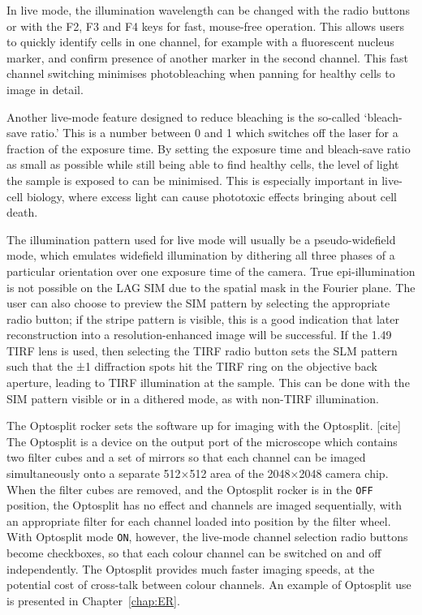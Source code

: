 In live mode, the illumination wavelength can be changed with the radio buttons or with the F2, F3 and F4 keys for fast, mouse-free operation. 
This allows users to quickly identify cells in one channel, for example with a fluorescent nucleus marker, and confirm presence of another marker in the second channel.
This fast channel switching minimises photobleaching when panning for healthy cells to image in detail. 

Another live-mode feature designed to reduce bleaching is the so-called `bleach-save ratio.' 
This is a number between 0 and 1 which switches off the laser for a fraction of the exposure time. 
By setting the exposure time and bleach-save ratio as small as possible while still being able to find healthy cells, the level of light the sample is exposed to can be minimised.
This is especially important in live-cell biology, where excess light can cause phototoxic effects bringing about cell death. 

The illumination pattern used for live mode will usually be a pseudo-widefield mode, which emulates widefield illumination by dithering all three phases of a particular orientation over one exposure time of the camera. 
True epi-illumination is not possible on the LAG SIM due to the spatial mask in the Fourier plane. 
The user can also choose to preview the SIM pattern by selecting the appropriate radio button; if the stripe pattern is visible, this is a good indication that later reconstruction into a resolution-enhanced image will be successful. 
If the \SI{1.49}{\numaperture} TIRF lens is used, then selecting the TIRF radio button sets the SLM pattern such that the ±1 diffraction spots hit the TIRF ring on the objective back aperture, leading to TIRF illumination at the sample. 
This can be done with the SIM pattern visible or in a dithered mode, as with non-TIRF illumination. 

The Optosplit rocker sets the software up for imaging with the Optosplit. [cite] 
The Optosplit is a device on the output port of the microscope which contains two filter cubes and a set of mirrors so that each channel can be imaged simultaneously onto a separate 512$\times$512 area of the 2048$\times$2048 camera chip.
When the filter cubes are removed, and the Optosplit rocker is in the \texttt{OFF} position, the Optosplit has no effect and channels are imaged sequentially, with an appropriate filter for each channel loaded into position by the filter wheel. 
With Optosplit mode \texttt{ON}, however, the live-mode channel selection radio buttons become checkboxes, so that each colour channel can be switched on and off independently. 
The Optosplit provides much faster imaging speeds, at the potential cost of cross-talk between colour channels. 
An example of Optosplit use is presented in Chapter~\ref{chap:ER}. %

